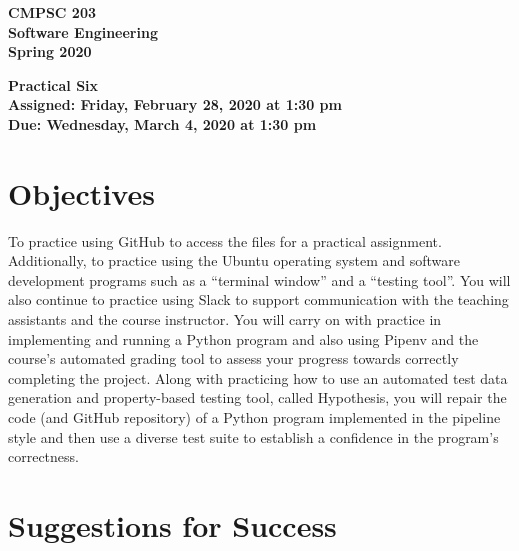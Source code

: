 \documentclass[11pt]{article}
\newcommand{\assignmentduedate}{March 4}
\newcommand{\assignmentassignedate}{February 28}
\newcommand{\assignmentnumber}{Six}
\newcommand{\labyear}{2020}
\newcommand{\labdueday}{Wednesday}
\newcommand{\labassignday}{Friday}
\newcommand{\labtime}{1:30 pm}
\newcommand{\assigneddate}{Assigned: \labassignday, \assignmentassignedate, \labyear{} at \labtime{}}
\newcommand{\duedate}{Due: \labdueday, \assignmentduedate, \labyear{} at \labtime{}}
\newcommand{\labtitle}[1]
{
  \begin{center}
    \begin{center}
      \bf
      CMPSC 203\\Software Engineering\\
      Spring 2020\\
      \medskip
    \end{center}
    \bf
    #1
  \end{center}
}
\begin{document}
\thispagestyle{empty}

\labtitle{Practical \assignmentnumber{} \\ \assigneddate{} \\ \duedate{}}

\section*{Objectives}

To practice using GitHub to access the files for a practical assignment.
Additionally, to practice using the Ubuntu operating system and software
development programs such as a ``terminal window'' and a ``testing tool''. You
will also continue to practice using Slack to support communication with the
teaching assistants and the course instructor. You will carry on with practice
in implementing and running a Python program and also using Pipenv and the
course's automated grading tool to assess your progress towards correctly
completing the project. Along with practicing how to use an automated test data
generation and property-based testing tool, called Hypothesis, you will repair
the code (and GitHub repository) of a Python program implemented in the pipeline
style and then use a diverse test suite to establish a confidence in the
program's correctness.

\section*{Suggestions for Success}
\end{document}
